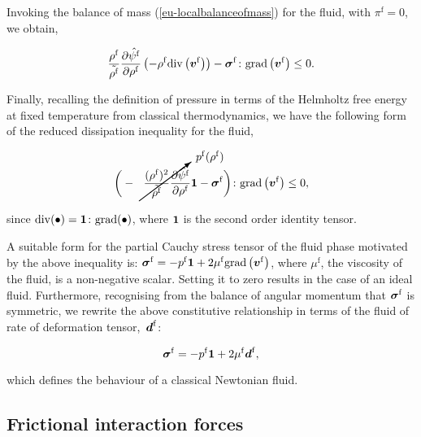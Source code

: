\noindent Invoking the balance of mass (\ref{eu-localbalanceofmass})
for the fluid, with $\pi^\mathrm{f} = 0$, we obtain,

\begin{equation*}
\frac{\rho^{\mathrm{f}}}{\tilde{\rho^{\mathrm{f}}}}
\frac{\partial \hat{\psi^{\mathrm{f}}}}{\partial \rho^{\mathrm{f}}}
\left(- \rho^{\mathrm{f}} \mathrm{div}\left(\mbox{\boldmath$ v$}^{\mathrm{f}}
\right)\right) 
-\mbox{\boldmath$\sigma$}^{\mathrm{f}}\colon\mathrm{grad}
\left(\mbox{\boldmath$ v$}^{\mathrm{f}}\right)
\leq 0.
\end{equation*}

\noindent Finally, recalling the definition of pressure in terms of
the Helmholtz free energy at fixed temperature from classical
thermodynamics, we have the following form of the reduced dissipation
inequality for the fluid,

\begin{equation*}
\bigg( - \cancelto{p^{\mathrm{f}}(\rho^{\mathrm{f}})}
{\frac{(\rho^{\mathrm{f}})^2}{\tilde{\rho^{\mathrm{f}}}}
\frac{\partial \hat{\psi^{\mathrm{f}}}}{\partial \rho^{\mathrm{f}}}}
\bone -\Bsigma^{\mathrm{f}} \bigg) \colon \mathrm{grad}\left(\bv^{\mathrm{f}}
\right)
\leq 0,
\end{equation*}

\noindent since \mbox{$\mathrm{div}(\bullet) = {\bf 1} \colon
  \mathrm{grad}(\bullet)$}, where ${\bf 1}$ is the second order
identity tensor.

A suitable form for the partial Cauchy stress tensor of the fluid
phase motivated by the above inequality is: $\mbox{\boldmath$\sigma$}^{\mathrm{f}} = -
p^{\mathrm{f}} {\bf 1} + 2 \mu^{\mathrm{f}} \mathrm{grad}\left(
\mbox{\boldmath$ v$}^{\mathrm{f}} \right)$, where $\mu^{\mathrm{f}}$, the viscosity of
the fluid, is a non-negative scalar. Setting it to zero results in the
case of an ideal fluid. Furthermore, recognising from the balance of
angular momentum that $\mbox{\boldmath$\sigma$}^{\mathrm{f}}$ is symmetric, we rewrite
the above constitutive relationship in terms of the fluid of rate of
deformation tensor,~$\mbox{\boldmath$ d$}^{\mathrm{f}}$:

\begin{equation}
\mbox{\boldmath$\sigma$}^{\mathrm{f}} = -
p^{\mathrm{f}} {\bf 1} + 2 \mu^{\mathrm{f}}\mbox{\boldmath$ d$}^{\mathrm{f}},
\label{eu-stress-rel-fluid}
\end{equation}

\noindent which defines the behaviour of a classical Newtonian fluid.

\subsection{Frictional interaction forces}
\label{eu-interaction-forces}

